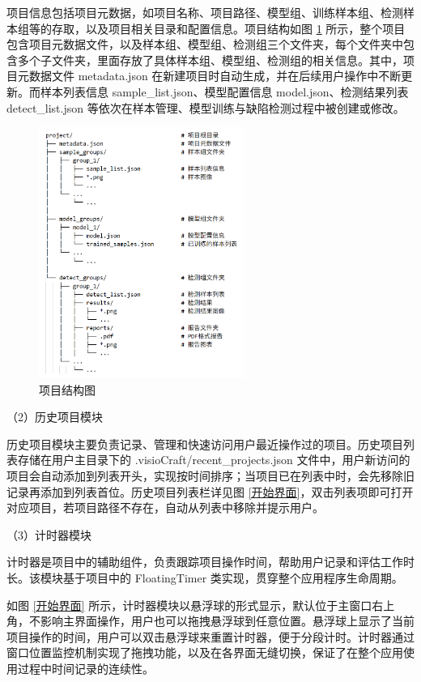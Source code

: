 \documentclass[
  ]{njuthesis}
\begin{document}
项目信息包括项目元数据，如项目名称、项目路径、模型组、训练样本组、检测样本组等的存取，以及项目相关目录和配置信息。项目结构如图 \ref{项目结构图} 所示，整个项目包含项目元数据文件，以及样本组、模型组、检测组三个文件夹，每个文件夹中包含多个子文件夹，里面存放了具体样本组、模型组、检测组的相关信息。其中，项目元数据文件 metadata.json 在新建项目时自动生成，并在后续用户操作中不断更新。而样本列表信息 sample\_list.json、模型配置信息 model.json、检测结果列表 detect\_list.json 等依次在样本管理、模型训练与缺陷检测过程中被创建或修改。

\begin{figure}[htb]
    \centering
    \includegraphics[width=0.6\textwidth]{images/项目结构图.png}
    \caption{项目结构图}
    \label{项目结构图}
\end{figure}

（2）历史项目模块

历史项目模块主要负责记录、管理和快速访问用户最近操作过的项目。历史项目列表存储在用户主目录下的 .visioCraft/recent\_projects.json 文件中，用户新访问的项目会自动添加到列表开头，实现按时间排序；当项目已在列表中时，会先移除旧记录再添加到列表首位。历史项目列表栏详见图 \ref{开始界面}，双击列表项即可打开对应项目，若项目路径不存在，自动从列表中移除并提示用户。

（3）计时器模块

计时器是项目中的辅助组件，负责跟踪项目操作时间，帮助用户记录和评估工作时长。该模块基于项目中的 FloatingTimer 类实现，贯穿整个应用程序生命周期。

如图 \ref{开始界面} 所示，计时器模块以悬浮球的形式显示，默认位于主窗口右上角，不影响主界面操作，用户也可以拖拽悬浮球到任意位置。悬浮球上显示了当前项目操作的时间，用户可以双击悬浮球来重置计时器，便于分段计时。计时器通过窗口位置监控机制实现了拖拽功能，以及在各界面无缝切换，保证了在整个应用使用过程中时间记录的连续性。
\end{document}
